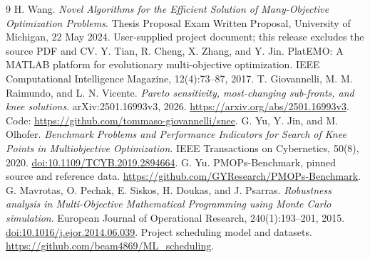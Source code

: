 \documentclass[11pt]{article}
\begin{document}
\begin{thebibliography}{9}
 H. Wang.
\emph{Novel Algorithms for the Efficient Solution of Many-Objective Optimization Problems}.
Thesis Proposal Exam Written Proposal, University of Michigan, 22 May 2024.
User-supplied project document; this release excludes the source PDF and CV.
 Y. Tian, R. Cheng, X. Zhang, and Y. Jin.
PlatEMO: A MATLAB platform for evolutionary multi-objective optimization.
IEEE Computational Intelligence Magazine, 12(4):73--87, 2017.
 T. Giovannelli, M. M. Raimundo, and L. N. Vicente.
\emph{Pareto sensitivity, most-changing sub-fronts, and knee solutions}.
arXiv:2501.16993v3, 2026. \url{https://arxiv.org/abs/2501.16993v3}.
Code: \url{https://github.com/tommaso-giovannelli/snee}.
 G. Yu, Y. Jin, and M. Olhofer.
\emph{Benchmark Problems and Performance Indicators for Search of Knee Points in Multiobjective Optimization}.
IEEE Transactions on Cybernetics, 50(8), 2020.
\href{https://doi.org/10.1109/TCYB.2019.2894664}{doi:10.1109/TCYB.2019.2894664}.
 G. Yu. PMOPs-Benchmark, pinned source and reference data.
\url{https://github.com/GYResearch/PMOPs-Benchmark}.
 G. Mavrotas, O. Pechak, E. Siskos, H. Doukas, and J. Psarras.
\emph{Robustness analysis in Multi-Objective Mathematical Programming using Monte Carlo simulation}.
European Journal of Operational Research, 240(1):193--201, 2015.
\href{https://doi.org/10.1016/j.ejor.2014.06.039}{doi:10.1016/j.ejor.2014.06.039}.
 Project scheduling model and datasets.
\url{https://github.com/beam4869/ML_scheduling}.
\end{thebibliography}
\end{document}
